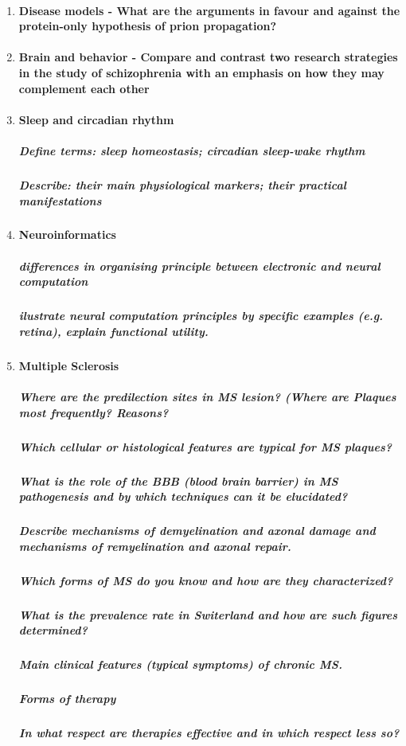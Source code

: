 \documentclass[12pt,article,oneside,a4paper]{memoir}
\begin{document}
\begin{enumerate}
\item \paragraph{Disease models - What are the arguments in favour and against the protein-only hypothesis of prion propagation?}
\item \paragraph{Brain and behavior - Compare and contrast two research strategies in the study of schizophrenia with an emphasis on how they may complement each other}
\item \paragraph{Sleep and circadian rhythm}
\subparagraph{Define terms: sleep homeostasis; circadian sleep-wake rhythm}
\subparagraph{Describe: their main physiological markers; their practical manifestations}
\item \paragraph{Neuroinformatics}
\subparagraph{differences in organising principle between electronic and neural computation}
\subparagraph{ilustrate neural computation principles by specific examples (e.g. retina), explain functional utility.}
\item \paragraph{Multiple Sclerosis}
\subparagraph{Where are the predilection sites in MS lesion? (Where are Plaques most frequently? Reasons?}
\subparagraph{Which cellular or histological features are typical for MS plaques?}
\subparagraph{What is the role of the BBB (blood brain barrier) in MS pathogenesis and by which techniques can it be elucidated?}
\subparagraph{Describe mechanisms of demyelination and axonal damage and mechanisms of remyelination and axonal repair.}
\subparagraph{Which forms of MS do you know and how are they characterized?}
\subparagraph{What is the prevalence rate in Switerland and how are such figures determined?}
\subparagraph{Main clinical features (typical symptoms) of chronic MS.}
\subparagraph{Forms of therapy}
\subparagraph{In what respect are therapies effective and in which respect less so?}
\end{enumerate}
\end{document}
